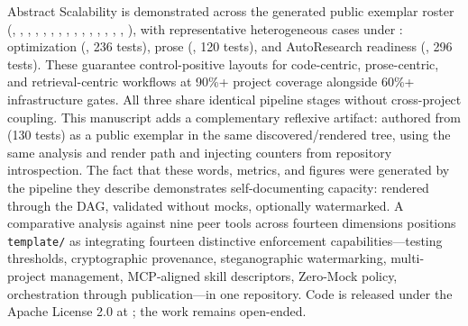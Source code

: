 \documentclass[
  ignorenonframetext,
]{beamer}
\begin{document}
\begin{frame}{Abstract}
Scalability is demonstrated across the generated public exemplar roster
(,
,
,
,
,
,
,
,
,
,
,
,
,
,
,
), with representative
heterogeneous cases under : optimization
(, 236 tests), prose
(, 120 tests), and AutoResearch
readiness (, 296 tests). These
guarantee control-positive layouts for code-centric, prose-centric, and
retrieval-centric workflows at 90\%+ project coverage alongside 60\%+
infrastructure gates. All three share identical pipeline stages without
cross-project coupling. This manuscript adds a complementary reflexive
artifact: authored from 
(130 tests) as a public exemplar in the same discovered/rendered tree,
using the same analysis and render path and injecting counters from
repository introspection. The fact that these words, metrics, and
figures were generated by the pipeline they describe demonstrates
self-documenting capacity: rendered through the DAG, validated without
mocks, optionally watermarked. A comparative analysis against nine peer
tools across fourteen dimensions positions \texttt{template/} as
integrating fourteen distinctive enforcement capabilities---testing
thresholds, cryptographic provenance, steganographic watermarking,
multi-project management, MCP-aligned skill descriptors, Zero-Mock
policy, orchestration through publication---in one repository. Code is
released under the Apache License 2.0 at
; the work remains open-ended.
\end{frame}
\end{document}
